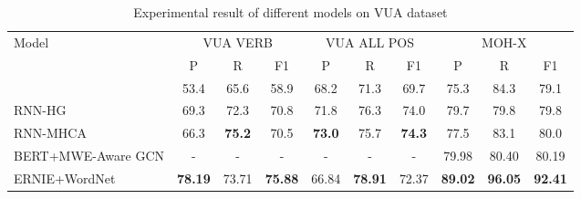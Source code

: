 \documentclass[11pt,a4paper]{article}
\begin{document}
\begin{table}[!htbp]
\begin{tabular}{lllllllllll|llllllllllll|llllllllllll|llllllllllll}
\hline
\multicolumn{11}{l|}{{Model}} & \multicolumn{12}{c|}{{VUA VERB}}  & \multicolumn{12}{c|}{{VUA ALL POS}} & \multicolumn{12}{c}{{MOH-X}} \\
\multicolumn{11}{l|}{{\quad}}   &\multicolumn{4}{c}{{P}} & \multicolumn{4}{c}{{R}} & \multicolumn{4}{c|}{{F1}}  & \multicolumn{4}{c}{{P}} & \multicolumn{4}{c}{{R}} & \multicolumn{4}{c|}{{F1}} &\multicolumn{4}{c}{{P}} & \multicolumn{4}{c}{{R}} & \multicolumn{4}{c}{{F1}} \\ \hline
\multicolumn{11}{l|}{\citet{gao2018neural}} &\multicolumn{4}{c}{{53.4}} & \multicolumn{4}{c}{{65.6}} & \multicolumn{4}{c|}{{58.9}}  &\multicolumn{4}{c}{{68.2}} & \multicolumn{4}{c}{{71.3}} & \multicolumn{4}{c|}{{69.7}}   &\multicolumn{4}{c}{{75.3}} & \multicolumn{4}{c}{{84.3}} & \multicolumn{4}{c}{{79.1}} \\
\multicolumn{11}{l|}{RNN-HG} &\multicolumn{4}{c}{{69.3}} & \multicolumn{4}{c}{{72.3}} & \multicolumn{4}{c|}{{70.8}}  &\multicolumn{4}{c}{{71.8}} &\multicolumn{4}{c}{{76.3}} & \multicolumn{4}{c|}{{74.0}}   &\multicolumn{4}{c}{{79.7}} & \multicolumn{4}{c}{{79.8}} & \multicolumn{4}{c}{{79.8}}\\
\multicolumn{11}{l|}{RNN-MHCA}  &\multicolumn{4}{c}{{66.3}} & \multicolumn{4}{c}{\textbf{75.2}} & \multicolumn{4}{c|}{{70.5}}  &\multicolumn{4}{c}{\textbf{73.0}} &\multicolumn{4}{c}{{75.7}} & \multicolumn{4}{c|}{\textbf{74.3}}    &\multicolumn{4}{c}{{77.5}} & \multicolumn{4}{c}{{ 83.1}} & \multicolumn{4}{c}{{ 80.0}}\\ 
\multicolumn{11}{l|}{BERT+MWE-Aware GCN}   &\multicolumn{4}{c}{{-}} &\multicolumn{4}{c}{{-}} & \multicolumn{4}{c|}{{-}}   &\multicolumn{4}{c}{{-}} & \multicolumn{4}{c}{{-}} & \multicolumn{4}{c|}{{-}}&\multicolumn{4}{c}{{79.98}} & \multicolumn{4}{c}{{80.40}} & \multicolumn{4}{c}{{80.19}}\\ \hline
\multicolumn{11}{l|}{ERNIE+WordNet} &\multicolumn{4}{c}{\textbf{78.19}} & \multicolumn{4}{c}{{73.71}} & \multicolumn{4}{c|}{\textbf{75.88}}  &\multicolumn{4}{c}{{66.84}} &\multicolumn{4}{c}{\textbf{78.91}} & \multicolumn{4}{c|}{{72.37}}    &\multicolumn{4}{c}{\textbf{89.02 }} & \multicolumn{4}{c}{\textbf{ 96.05}} & \multicolumn{4}{c}{\textbf{ 92.41}}
\end{tabular}
\caption{Experimental result of different models on VUA dataset}
\label{table1}
\end{table}
\end{document}
